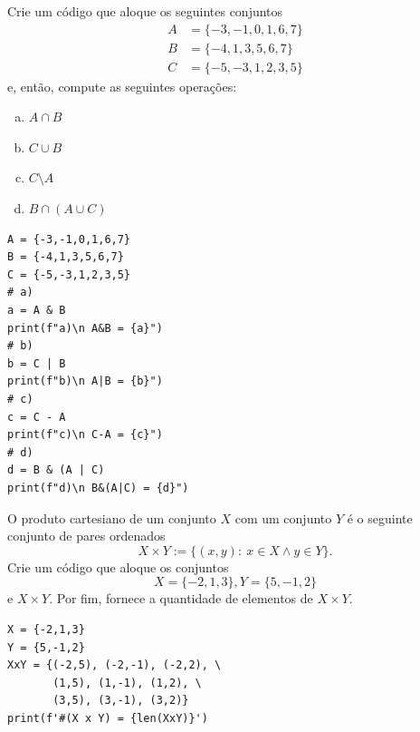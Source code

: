 \begin{exer}
  Crie um código que aloque os seguintes conjuntos
  \begin{align}
    A &= \{-3,-1,0,1,6,7\}\\
    B &= \{-4,1,3,5,6,7\}\\
    C &= \{-5,-3,1,2,3,5\}
  \end{align}
  e, então, compute as seguintes operações:
  \begin{enumerate}[a)]
  \item $A\cap B$\\
  \item $C\cup B$\\
  \item $C\setminus A$\\
  \item $B\cap (A\cup C)$
  \end{enumerate}
\end{exer}
\begin{resp}
\begin{lstlisting}
A = {-3,-1,0,1,6,7}
B = {-4,1,3,5,6,7}
C = {-5,-3,1,2,3,5}
# a)
a = A & B
print(f"a)\n A&B = {a}")
# b)
b = C | B
print(f"b)\n A|B = {b}")
# c)
c = C - A
print(f"c)\n C-A = {c}")
# d)
d = B & (A | C)
print(f"d)\n B&(A|C) = {d}")
\end{lstlisting}
\end{resp}

\begin{exer}
  O produto cartesiano{\descartes} de um conjunto $X$ com um conjunto $Y$ é o seguinte conjunto de pares ordenados
  \begin{equation}
    X\times Y := \{(x,y):~x\in X \land y\in Y\}.
  \end{equation}
  Crie um código que aloque os conjuntos
  \begin{equation}
    X = \{-2,1,3\},
    Y = \{5,-1,2\}
  \end{equation}
  e $X\times Y$. Por fim, fornece a quantidade de elementos de $X\times Y$.
\end{exer}
\begin{resp}
\begin{lstlisting}
X = {-2,1,3}
Y = {5,-1,2}
XxY = {(-2,5), (-2,-1), (-2,2), \
       (1,5), (1,-1), (1,2), \
       (3,5), (3,-1), (3,2)}
print(f'#(X x Y) = {len(XxY)}')
\end{lstlisting}
\end{resp}

